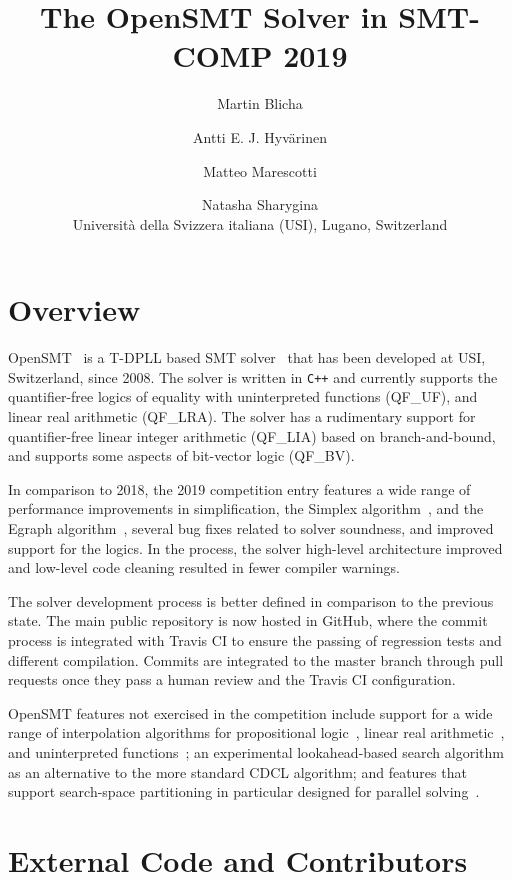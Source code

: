 \documentclass{article}
\title{The OpenSMT Solver in SMT-COMP 2019}
\author{
Martin Blicha \and 
Antti E. J. Hyv{\"a}rinen \and
Matteo Marescotti \and
Natasha Sharygina \\
{\small Universit{\`a} della Svizzera italiana (USI), Lugano,
Switzerland}
}
\date{}
\begin{document}
\maketitle

\section{Overview}

OpenSMT~\cite{HyvarinenMAS16} is a T-DPLL based SMT
solver~\cite{NieuwenhuisOT:JACM06} that has been developed at USI,
Switzerland, since 2008.  The solver is written in {\tt C++} and
currently supports the quantifier-free logics of equality with
uninterpreted functions (QF\_UF), and linear real arithmetic (QF\_LRA).
The solver has a rudimentary support for quantifier-free linear integer
arithmetic (QF\_LIA) based on branch-and-bound, and supports some
aspects of bit-vector logic (QF\_BV).

In comparison to 2018, the 2019 competition entry features a wide range
of performance improvements in simplification, the Simplex
algorithm~\cite{DutertreM:CAV06}, and the Egraph
algorithm~\cite{DetlefsNS:JAC05}, several bug fixes related to solver
soundness, and improved support for the logics.  In the process, the
solver high-level architecture improved and low-level code cleaning
resulted in fewer compiler warnings.

The solver development process is better defined in comparison to the
previous state.  The main public repository
 is now
hosted in GitHub, where the commit process is integrated with Travis CI
to ensure the passing of regression tests and different compilation.
Commits are integrated to the master branch through pull requests once
they pass a human review and the Travis CI configuration.

OpenSMT features not exercised in the competition include support for a
wide range of interpolation algorithms for propositional
logic~\cite{AltFHS:VSTTE2015}, linear real
arithmetic~\cite{BlichaHKS19}, and uninterpreted
functions~\cite{AltHAS:FMCAD17}; an experimental look\-ahead-based
search algorithm~\cite{HyvarinenMSCS18} as an alternative to the more
standard CDCL algorithm; and features that support search-space
partitioning in particular designed for parallel
solving~\cite{HyvarinenMS:SAT15}.

\section{External Code and Contributors}
\end{document}
